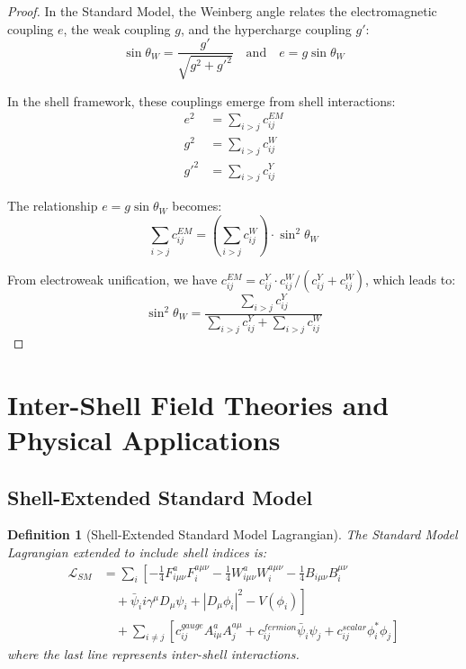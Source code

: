 \documentclass[12pt,a4paper]{article}
\newtheorem{definition}{Definition}[section]
\begin{document}
\begin{proof}
In the Standard Model, the Weinberg angle relates the electromagnetic coupling $e$, the weak coupling $g$, and the hypercharge coupling $g'$:
\begin{equation}
\sin\theta_W = \frac{g'}{\sqrt{g^2 + g'^2}} \quad \text{and} \quad e = g\sin\theta_W
\end{equation}

In the shell framework, these couplings emerge from shell interactions:
\begin{align}
e^2 &= \sum_{i>j} c_{ij}^{EM} \\
g^2 &= \sum_{i>j} c_{ij}^W \\
g'^2 &= \sum_{i>j} c_{ij}^Y
\end{align}

The relationship $e = g\sin\theta_W$ becomes:
\begin{equation}
\sum_{i>j} c_{ij}^{EM} = \left(\sum_{i>j} c_{ij}^W\right) \cdot \sin^2\theta_W
\end{equation}

From electroweak unification, we have $c_{ij}^{EM} = c_{ij}^Y \cdot c_{ij}^W / (c_{ij}^Y + c_{ij}^W)$, which leads to:
\begin{equation}
\sin^2\theta_W = \frac{\sum_{i>j} c_{ij}^Y}{\sum_{i>j} c_{ij}^Y + \sum_{i>j} c_{ij}^W}
\end{equation}
\end{proof}

\section{Inter-Shell Field Theories and Physical Applications}
\label{sec:applications}

\subsection{Shell-Extended Standard Model}
\label{subsec:extended-standard-model}

\begin{definition}[Shell-Extended Standard Model Lagrangian]
\label{def:sm-lagrangian}
The Standard Model Lagrangian extended to include shell indices is:
\begin{align}
\mathcal{L}_{SM} &= \sum_i \left[-\frac{1}{4}F_{i\mu\nu}^a F_i^{a\mu\nu} - \frac{1}{4}W_{i\mu\nu}^a W_i^{a\mu\nu} - \frac{1}{4}B_{i\mu\nu} B_i^{\mu\nu} \right. \\
&\quad + \left. \bar{\psi}_i i\gamma^\mu D_{\mu} \psi_i + |D_\mu \phi_i|^2 - V(\phi_i) \right] \\
&\quad + \sum_{i \neq j} \left[c_{ij}^{gauge} A_{i\mu}^a A_j^{a\mu} + c_{ij}^{fermion} \bar{\psi}_i \psi_j + c_{ij}^{scalar} \phi_i^* \phi_j \right]
\end{align}
where the last line represents inter-shell interactions.
\end{definition}
\end{document}
